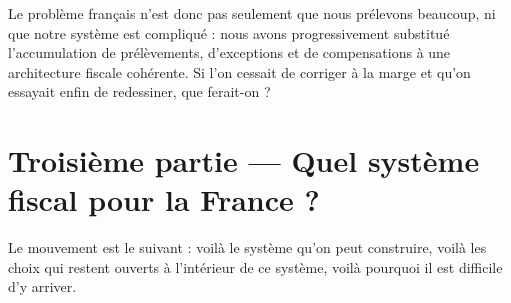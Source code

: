 \documentclass[11pt,a4paper]{article}
\begin{document}
Le problème français n'est donc pas seulement que nous prélevons beaucoup, ni que notre système est
compliqué : nous avons progressivement substitué l'accumulation de prélèvements, d'exceptions et de
compensations à une architecture fiscale cohérente. Si l'on cessait de corriger à la marge et qu'on
essayait enfin de redessiner, que ferait-on ?

\section{Troisième partie --- Quel système fiscal pour la France ?}

Le mouvement est le suivant : voilà le système qu'on peut construire, voilà les choix qui restent
ouverts à l'intérieur de ce système, voilà pourquoi il est difficile d'y arriver.
\end{document}
